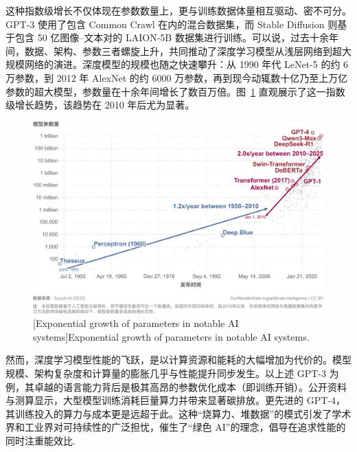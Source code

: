 \documentclass[../main.tex]{subfiles}
\begin{document}
这种指数级增长不仅体现在参数数量上，更与训练数据体量相互驱动、密不可分。GPT-3 使用了包含 Common Crawl 在内的混合数据集\cite{languagemodelsare_brown_2020}，而 Stable Diffusion 则基于包含 50 亿图像–文本对的 LAION-5B 数据集进行训练\cite{laion5bopen_schuhmann_2022}。可以说，过去十余年间，数据、架构、参数三者螺旋上升，共同推动了深度学习模型从浅层网络到超大规模网络的演进。深度模型的规模也随之快速攀升：从 1990 年代 LeNet-5 的约 6 万参数\cite{gradientbasedlearning_lecun_1998}，到 2012 年 AlexNet 的约 6000 万参数\cite{imagenetclassificationdeep_krizhevsky_2012}，再到现今动辄数十亿乃至上万亿参数的超大模型，参数量在十余年间增长了数百万倍。图~\ref{fig:Ch1-1_model_parameter_evolve} 直观展示了这一指数级增长趋势，该趋势在 2010 年后尤为显著。

\begin{figure}
	\centering
	\includegraphics[width=.85\textwidth]{Ch1-1_model_parameter_evolve.pdf}
	[Exponential growth of parameters in notable AI systems]{Exponential growth of parameters in notable AI systems.}
	\label{fig:Ch1-1_model_parameter_evolve}
\end{figure}

然而，深度学习模型性能的飞跃，是以计算资源和能耗的大幅增加为代价的。模型规模、架构复杂度和计算量的膨胀几乎与性能提升同步发生。以上述 GPT-3 为例，其卓越的语言能力背后是极其高昂的参数优化成本（即训练开销）\cite{languagemodelsare_brown_2020}。公开资料与测算显示，大型模型训练消耗巨量算力并带来显著碳排放\cite{energypolicyconsiderations_strubell_2019,carbonfootprintmachine_patterson_2021}。更先进的 GPT-4，其训练投入的算力与成本更是远超于此\cite{gpt4technical_openai_2023}。这种“烧算力、堆数据”的模式引发了学术界和工业界对可持续性的广泛担忧，催生了“绿色 AI”的理念，倡导在追求性能的同时注重能效比\cite{energypolicyconsiderations_strubell_2019}.
\end{document}
